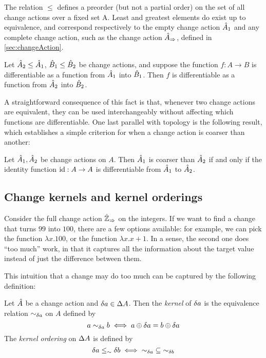 The relation $\leq$  defines a preorder (but not a partial order) on the set of all change actions 
over a fixed set A. Least and greatest elements do exist up to equivalence, and correspond
respectively to the empty change action $\hat{A}_1$ and any complete change
action, such as the change action $\hat{A}_\Rightarrow$,
defined in \cref{sec:changeAction}.

\begin{prop}
  Let $\hat{A}_2 \leq \hat{A}_1$, $\hat{B}_1 \leq \hat{B}_2$ be change actions, and suppose
  the function $f : A \rightarrow B$ is differentiable as a function from $\hat{A}_1$ into
  $\hat{B}_1$. Then $f$ is differentiable as a function from $\hat{A}_2$ into $\hat{B}_2$.
\end{prop}

A straightforward consequence of this fact is that, whenever two change actions are equivalent,
they can be used interchangeably without affecting which functions are differentiable. One last parallel with topology
is the following result, which establishes a simple criterion for when a change action is coarser than
another:

\begin{prop}
  Let $\hat{A}_1, \hat{A}_2$ be change actions on $A$. Then $\hat{A}_1$ is coarser than $\hat{A}_2$
  if and only if the identity function $\operatorname{id} : A \rightarrow A$ is differentiable from $\hat{A}_1$ to
  $\hat{A}_2$.
\end{prop}

\subsection{Change kernels and kernel orderings}

Consider the full change action $\hat{\mathbb{Z}}_\Rightarrow$ on the integers.
If we want to find a change that turns $99$ into $100$, there
are a few options available: for example, we can pick the function $\lambda x . 100$, or
the function $\lambda x . x + 1$. In a sense, the second one does ``too much''
work, in that it captures all the information about the target value instead of
just the difference between them.

This intuition that a change may do too much can be captured by the following definition:
\begin{defn}
  Let $\hat{A}$ be a change action and $\delta a \in \Delta A$. Then the
  \emph{kernel} of $\delta a$ is the equivalence relation $\sim_{\delta a}$ on $A$
  defined by
  \begin{displaymath}
    a \sim_{\delta a} b \iff 
     a \oplus \delta a = b \oplus \delta a
  \end{displaymath}
  The \emph{kernel ordering} on $\Delta A$ is defined by
  \begin{displaymath}
    {\delta a \leq_\sim\delta b} \iff {{\sim_{\delta a}} \subseteq {\sim_{\delta b}}}
  \end{displaymath}
\end{defn}

